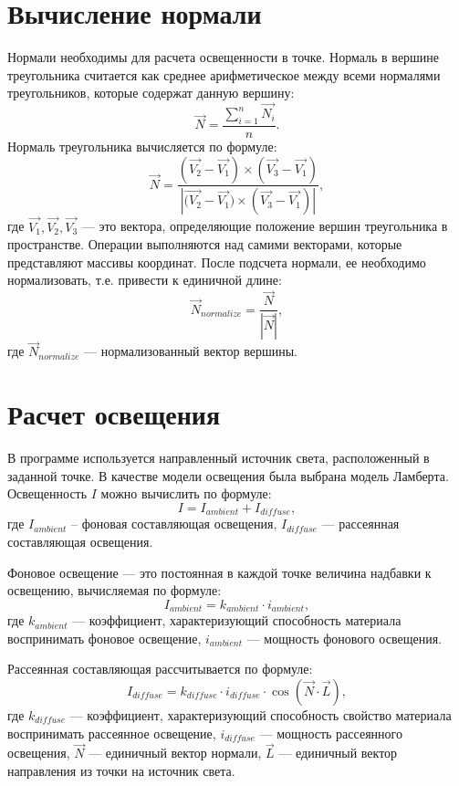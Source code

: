 \section{Вычисление нормали}
Нормали необходимы для расчета освещенности в точке. Нормаль в вершине треугольника считается как среднее арифметическое между всеми нормалями треугольников, которые содержат данную вершину:
\begin{equation}
    \vec{N} = \frac{\displaystyle\sum_{i=1}^n \vec{N_i}}{n}.
\end{equation}
Нормаль треугольника вычисляется по формуле:
\begin{equation}
    \vec{N} = \frac{(\vec{V_2} - \vec{V_1}) \times (\vec{V_3} - \vec{V_1})}{|\vec{(V_2} - \vec{V_1}) \times (\vec{V_3} - \vec{V_1})|},
\end{equation}
где $\vec{V_1}, \vec{V_2}, \vec{V_3}$ --- это вектора, определяющие положение вершин треугольника в пространстве. Операции выполняются над самими векторами, которые представляют массивы координат.
После подсчета нормали, ее необходимо нормализовать, т.е. привести к единичной длине:
\begin{equation}
    \vec{N}_{normalize} = \frac{\vec{N}}{|\vec{N}|},
\end{equation}
где $\vec{N}_{normalize}$ --- нормализованный вектор вершины.

\section{Расчет освещения}
В программе используется направленный источник света, расположенный в заданной точке. В качестве модели освещения была выбрана модель Ламберта. Освещенность $I$ можно вычислить по формуле:
\begin{equation}
    I = I_{ambient} + I_{diffuse}, 
\end{equation}
где $I_{ambient}$ -- фоновая составляющая освещения, $I_{diffuse}$ --- рассеянная составляющая освещения.

Фоновое освещение --- это постоянная в каждой точке величина надбавки к освещению, вычисляемая по формуле:
\begin{equation}
    I_{ambient} = k_{ambient} \cdot i_{ambient},
\end{equation}
где $k_{ambient}$ --- коэффициент, характеризующий способность материала воспринимать фоновое освещение, $i_{ambient}$ --- мощность фонового освещения.

Рассеянная составляющая рассчитывается по формуле:
\begin{equation}
    I_{diffuse} = k_{diffuse} \cdot i_{diffuse} \cdot \cos(\vec{N} \cdot \vec{L}),
\end{equation}
где $k_{diffuse}$ --- коэффициент, характеризующий способность свойство материала воспринимать рассеянное освещение, $i_{diffuse}$ --- мощность рассеянного освещения, $\vec{N}$ --- единичный вектор нормали, $\vec{L}$ --- единичный вектор направления из точки на источник света.

